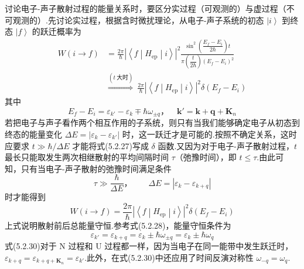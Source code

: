 讨论电子-声子散射过程的能量关系时，要区分实过程（可观测的）与虚过程（不可观测的）.先讨论实过程，根据含时微扰理论，从电子-声子系统的初态 $\left|i\right\rangle$ 到终态 $\left|f\right\rangle$ 的跃迁概率为
\begin{equation}
\begin{aligned}
  W\left(i\to f\right)&=\frac{2\pi}{\hbar}\left|\left\langle f\middle|H_{\mathrm{ep}}\middle|i\right\rangle\right|^2
  \frac{\sin^{2}\left(\dfrac{E_f-E_i}{2\hbar}\right)t}{\pi\left(\dfrac{t}{2\hbar}\right)\left(E_f-E_i\right)^2}\\
  &\overset{(t\ \text{大时})}{\Longrightarrow}\ \frac{2\pi}{\hbar}
  \left|\left\langle f\middle|H_{\mathrm{ep}}\middle|i\right\rangle\right|^2\delta\left(E_f-E_i\right)
\end{aligned}
\end{equation}
其中
\begin{equation}
  E_f-E_i=\varepsilon_{k'}-\varepsilon_k\mp\hbar\omega_{\pm q}
  \text{，}\quad \boldsymbol{k}'=\boldsymbol{k}+\boldsymbol{q}+\boldsymbol{K}_n
\end{equation}
若把电子与声子看作两个相互作用的子系统，则只有当我们能够确定电子从初态到终态的能量变化 $\Delta E=\left|\varepsilon_k-\varepsilon_{k'}\right|$ 时，这一跃迁才是可能的.按照不确定关系，这时应要求 $t\gg\hbar/\Delta E$ 才能将式(5.2.27)写成 $\delta$ 函数.又因为对于电子-声子散射过程，$t$ 最长只能取发生两次相继散射的平均间隔时间 $\tau$（弛豫时间），即 $t\leqslant\tau$.由此可知，只有当电子-声子散射的弛豫时间满足条件
\begin{equation*}
  \tau\gg\frac{\hbar}{\Delta E}\text{，}\qquad \Delta E=\left|\varepsilon_k-\varepsilon_{k+q}\right|
\end{equation*}
时才能得到
\begin{equation}
  W\left(i\to f\right)=\frac{2\pi}{\hbar}\left|\left\langle f\middle|H_{\mathrm{ep}}\middle|i\right\rangle\right|^2
  \delta\left(E_f-E_i\right)
\end{equation}
上式说明散射前后总能量守恒.参考式(5.2.28)，能量守恒条件为
\begin{equation}
  \varepsilon_{k'}=\varepsilon_{k+q}=\varepsilon_k\pm\hbar\omega_{\pm q}=\varepsilon_k\pm\hbar\omega_q
\end{equation}
式(5.2.30)对于 N 过程和 U 过程都一样，因为当电子在同一能带中发生跃迁时，$\varepsilon_{k+q}=\varepsilon_{k+q+\boldsymbol{K}_n}=\varepsilon_{k'}$.此外，在式(5.2.30)中还应用了时间反演对称性 $\omega_{-q}=\omega_q$.

